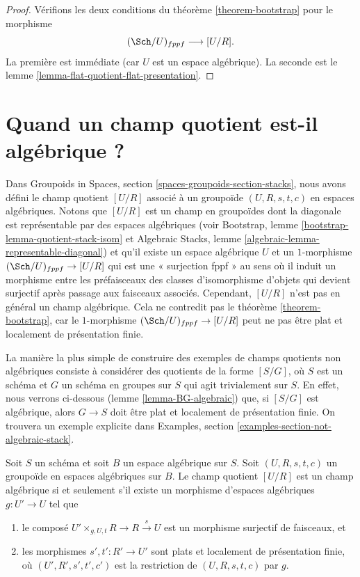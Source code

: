 \begin{proof}
Vérifions les deux conditions du
théorème \ref{theorem-bootstrap}
pour le morphisme
$$
(\Sch/U)_{fppf} \longrightarrow [U/R].
$$
La première est immédiate (car $U$ est un espace algébrique).
La seconde est le
lemme \ref{lemma-flat-quotient-flat-presentation}.
\end{proof}









\section{Quand un champ quotient est-il algébrique ?}
\label{section-quotient-algebraic}

\noindent
Dans
Groupoids in Spaces, section \ref{spaces-groupoids-section-stacks},
nous avons défini le champ quotient $[U/R]$ associé à un groupoïde
$(U, R, s, t, c)$ en espaces algébriques. Notons que $[U/R]$ est un champ
en groupoïdes dont la diagonale est représentable par des espaces algébriques (voir
Bootstrap, lemme \ref{bootstrap-lemma-quotient-stack-isom}
et
Algebraic Stacks, lemme \ref{algebraic-lemma-representable-diagonal})
et qu'il existe un espace algébrique $U$ et un $1$-morphisme
$(\Sch/U)_{fppf} \to [U/R]$ qui est une « surjection fppf »
au sens où il induit un morphisme entre les préfaisceaux des classes d'isomorphisme
d'objets qui devient surjectif après passage aux faisceaux associés.
Cependant, $[U/R]$ n'est pas en général un champ
algébrique. Cela ne contredit pas le
théorème \ref{theorem-bootstrap},
car le $1$-morphisme $(\Sch/U)_{fppf} \to [U/R]$ peut ne pas
être plat et localement de présentation finie.

\medskip\noindent
La manière la plus simple de construire des exemples de champs quotients non algébriques
consiste à considérer des quotients de la forme $[S/G]$, où $S$ est un schéma et $G$
un schéma en groupes sur $S$ qui agit trivialement sur $S$. En effet, nous verrons
ci-dessous
(lemme \ref{lemma-BG-algebraic})
que, si $[S/G]$ est algébrique, alors $G \to S$ doit être plat et localement
de présentation finie. On trouvera un exemple explicite dans
Examples, section \ref{examples-section-not-algebraic-stack}.

\begin{lemma}
\label{lemma-quotient-algebraic}
Soit $S$ un schéma et soit $B$ un espace algébrique sur $S$.
Soit $(U, R, s, t, c)$ un groupoïde en espaces algébriques sur $B$.
Le champ quotient $[U/R]$ est un champ algébrique si et seulement s'il
existe un morphisme d'espaces algébriques $g : U' \to U$ tel que
\begin{enumerate}
\item le composé
$U' \times_{g, U, t} R \to R \xrightarrow{s} U$ est un morphisme surjectif de
faisceaux, et
\item les morphismes $s', t' : R' \to U'$ sont plats et localement de présentation
finie, où $(U', R', s', t', c')$ est la restriction de
$(U, R, s, t, c)$ par $g$.
\end{enumerate}
\end{lemma}

